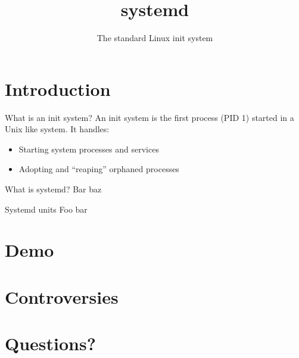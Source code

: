 \documentclass[14pt]{beamer}
\title{systemd}
\subtitle{The standard Linux init system}
\begin{document}

\maketitle

\section{Introduction}

\begin{frame}{What is an init system?}
  An init system is the first process (PID 1) started in a Unix like system. It handles:

  \begin{itemize}
    \item Starting system processes and services
    \item Adopting and ``reaping'' orphaned processes
  \end{itemize}
\end{frame}

\begin{frame}{What is systemd?}
  Bar baz
\end{frame}

\begin{frame}{Systemd units}
  Foo bar
\end{frame}

\section{Demo}

\section{Controversies}

\section{Questions?}
\end{document}
